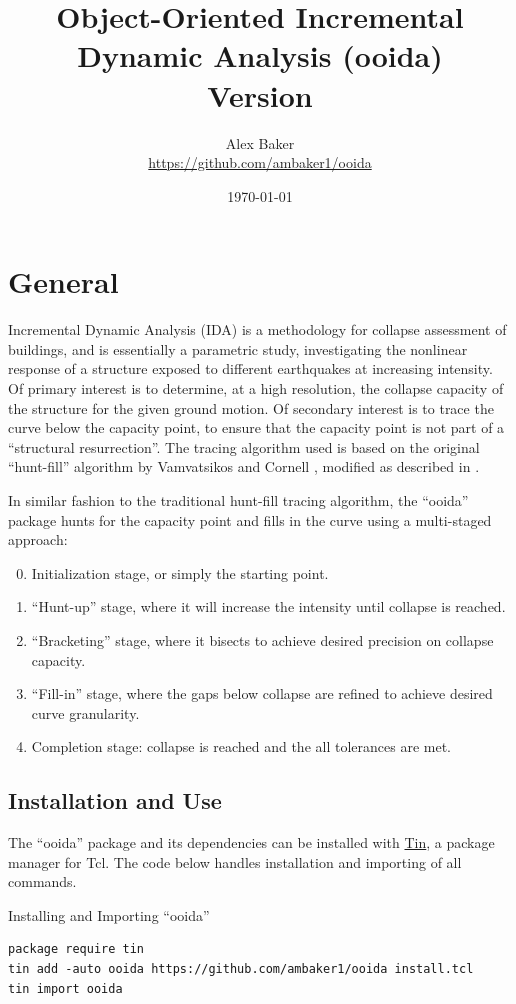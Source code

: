 \documentclass{article}
\title{\LARGE Object-Oriented Incremental Dynamic Analysis (ooida)\\\small Version \version}
\author{Alex Baker\\\small\url{https://github.com/ambaker1/ooida}}
\date{\small\today}
\renewcommand{\^}[1]{\textsuperscript{#1}}
\renewcommand{\_}[1]{\textsubscript{#1}}
\begin{document}
\maketitle
\clearpage
\section{General}
Incremental Dynamic Analysis (IDA) is a methodology for collapse assessment of buildings, and is essentially a parametric study, investigating the nonlinear response of a structure exposed to different earthquakes at increasing intensity. 
Of primary interest is to determine, at a high resolution, the collapse capacity of the structure for the given ground motion.
Of secondary interest is to trace the curve below the capacity point, to ensure that the capacity point is not part of a ``structural resurrection''.
The tracing algorithm used is based on the original ``hunt-fill'' algorithm by Vamvatsikos and Cornell  \cite{vamvatsikos_incremental_2002,vamvatsikos_performing_2011}, modified as described in \cite{baker_kinematics_2022}.

In similar fashion to the traditional hunt-fill tracing algorithm, the ``ooida'' package hunts for the capacity point and fills in the curve using a multi-staged approach:
\begin{enumerate}[label=\quad Stage \arabic*:,itemindent=*]
  \setcounter{enumi}{-1}
  \item Initialization stage, or simply the starting point. 
  \item ``Hunt-up'' stage, where it will increase the intensity until collapse is reached. 
  \item ``Bracketing'' stage, where it bisects to achieve desired precision on collapse capacity. 
  \item ``Fill-in'' stage, where the gaps below collapse are refined to achieve desired curve granularity. 
  \item Completion stage: collapse is reached and the all tolerances are met.
\end{enumerate}
\subsection{Installation and Use}
The ``ooida'' package and its dependencies can be installed with \textcolor{blue}{\href{https://github.com/ambaker1/Tin}{Tin}}, a package manager for Tcl.
The code below handles installation and importing of all commands.
\begin{example}{Installing and Importing ``ooida''}
\begin{lstlisting}
package require tin
tin add -auto ooida https://github.com/ambaker1/ooida install.tcl
tin import ooida
\end{lstlisting}
\end{example}
\end{document}
